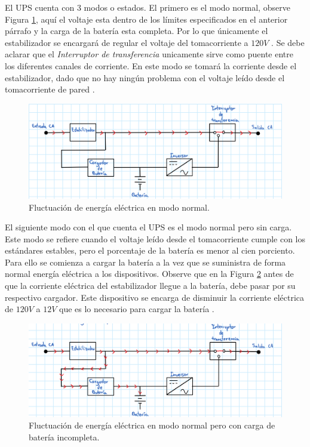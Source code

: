 \documentclass[runningheads]{llncs}
\begin{document}
        El UPS cuenta con 3 modos o estados. El primero es el modo normal, observe Figura \ref{fig:ups_modo_normal}, aquí el voltaje esta dentro de los límites especificados en el anterior párrafo y la carga de la batería esta completa. Por lo que únicamente el estabilizador se encargará de regular el voltaje del tomacorriente a $ 120 V $ \cite{regulador_de_voltaje}. Se debe aclarar que el \emph{Interruptor de transferencia} unicamente sirve como puente entre los diferentes canales de corriente. En este modo se tomará la corriente desde el estabilizador, dado que no hay ningún problema con el voltaje leído desde el tomacorriente de pared \cite{ups_circuito}.
        
        \begin{figure}[H]
            \centering
            \includegraphics[width=\textwidth]{ups_modo_normal}
            \caption{Fluctuación de energía eléctrica en modo normal.}
            \label{fig:ups_modo_normal}
        \end{figure}

        El siguiente modo con el que cuenta el UPS es el modo normal pero sin carga. Este modo se refiere cuando el voltaje leído desde el tomacorriente cumple con los estándares estables, pero el porcentaje de la batería es menor al cien porciento. Para ello se comienza a cargar la batería a la vez que se suministra de forma normal energía eléctrica a los dispositivos. Observe que en la Figura \ref{fig:ups_modo_normal_carga} antes de que la corriente eléctrica del estabilizador llegue a la batería, debe pasar por su respectivo cargador. Este dispositivo se encarga de disminuir la corriente eléctrica de $ 120 V $ a $ 12 V $ que es lo necesario para cargar la batería \cite{cargador_de_bateria}.

        \begin{figure}[H]
            \centering
            \includegraphics[width=\textwidth]{ups_modo_normal_carga}
            \caption{Fluctuación de energía eléctrica en modo normal pero con carga de batería incompleta.}
            \label{fig:ups_modo_normal_carga}
        \end{figure}
        
\end{document}
